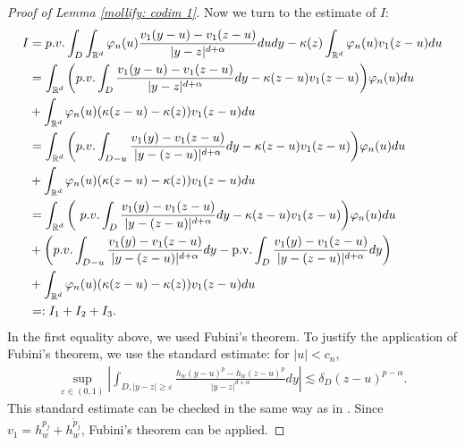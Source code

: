 \documentclass[12pt,a4paper]{amsart}
\numberwithin{equation}{section}
\theoremstyle{plain}
\newcommand{\mb}{\mathbb}
\newcommand{\wt}{\widetilde}
\newcommand{\1}{\mathbbm{1}}
\begin{document}
\begin{proof}[Proof of Lemma \ref{mollify: codim 1}]
Now we turn to the estimate of $I$: 
\begin{align*}
I &= {\rm p.v.}\int_D \int_{\mb R^d} \varphi_n(u) \frac{v_1(y-u) - v_1(z-u)}{|y-z|^{d+\alpha}}du dy - \kappa(z) \int_{\mb R^d} \varphi_n(u)v_1(z-u)du \\
& = \int_{\mb R^d} \bigg({\rm p.v.}\int_D \frac{v_1(y-u) - v_1(z-u)}{|y-z|^{d+\alpha}}dy - \kappa(z-u)v_1(z-u) \bigg) \varphi_n(u)du \\
& +  \int_{\mb R^d} \varphi_n(u)(\kappa(z-u)-\kappa(z))v_1(z-u)du \\
& =\int_{\mb R^d} \bigg( {\rm p.v.}\int_{D-u} \frac{v_1(y) - v_1(z-u)}{|y-(z-u)|^{d+\alpha}}dy - \kappa(z-u)v_1(z-u) \bigg) \varphi_n(u)du \\
& +  \int_{\mb R^d} \varphi_n(u)(\kappa(z-u)-\kappa(z))v_1(z-u)du \\
& = \int_{\mb R^d} \bigg({\ \rm p.v.}\int_{D} \frac{v_1(y) - v_1(z-u)}{|y-(z-u)|^{d+\alpha}}dy - \kappa(z-u)v_1(z-u) \bigg) \varphi_n(u)du \\
& + \bigg({\rm p.v.}\int_{D -u} \frac{v_1(y) - v_1(z-u)}{|y-(z-u)|^{d+\alpha}}dy   - \text{p.v.}\int_{D} \frac{v_1(y) - v_1(z-u)}{|y-(z-u)|^{d+\alpha}}dy \bigg) \\
& +  \int_{\mb R^d} \varphi_n(u)(\kappa(z-u)-\kappa(z))v_1(z-u)du \\
& =: I_1 + I_2 + I_3.
\end{align*}
In the first equality above, we used Fubini's theorem.
To justify the application of Fubini's theorem, we use the standard estimate: for $|u|<c_n$,
\begin{align*}
\sup_{\varepsilon \in (0,1)} \left|\int_{D, |y-z|\ge \varepsilon} \frac{h_w(y-u)^p - h_w(z-u)^p}{|y-z|^{d+\alpha}}dy \right| \lesssim 
\delta_{D}(z-u)^{p-\alpha}.
\end{align*}
This standard estimate can be checked in the same way as in \cite[(3.14)]{CKSV20}. 
Since $v_1 = h_w^{p_j} + h_w^{\wt p_j}$, Fubini's theorem can be applied.


\end{proof}
\end{document}
